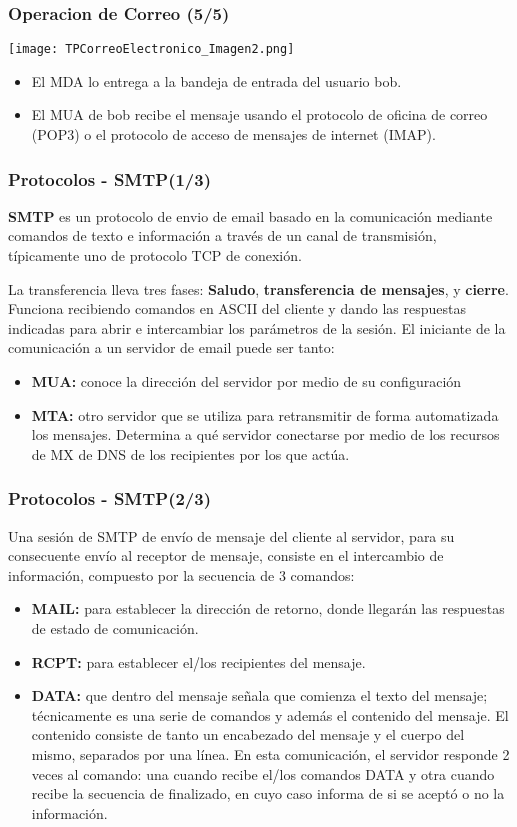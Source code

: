 \documentclass{beamer}
\begin{document}
\begin{frame}
\frametitle{Operacion de Correo (5/5)}
\tableofcontents
\centering
\texttt{[image: TPCorreoElectronico\_Imagen2.png]}
\begin{itemize}
\item \small El MDA lo entrega a la bandeja de entrada del usuario bob.
\item \small El MUA de bob recibe el mensaje usando el protocolo de oficina de correo (POP3) o el protocolo de acceso de mensajes de internet (IMAP).
\end{itemize}

\end{frame}


\begin{frame}
\frametitle{Protocolos -  SMTP(1/3)}
\tableofcontents
\textbf{SMTP} es un protocolo de envio de email basado en la comunicación mediante comandos de texto e información a través de un canal de transmisión, típicamente uno de protocolo TCP de conexión.

La transferencia lleva tres fases: \textbf{Saludo}, \textbf{transferencia de mensajes}, y\textbf{ cierre}.  Funciona recibiendo comandos en ASCII del cliente y dando las respuestas indicadas para abrir e intercambiar los parámetros de la sesión.
El iniciante de la comunicación a un servidor de email puede ser tanto:
\begin{itemize}
\item \small \textbf{MUA:} conoce la dirección del servidor por medio de su configuración
\item \small \textbf{MTA:} otro servidor que se utiliza para retransmitir de forma automatizada los mensajes.  Determina a qué servidor conectarse por medio de los recursos de MX de DNS de los recipientes por los que actúa. 
\end{itemize}

\end{frame}

\begin{frame}
\frametitle{Protocolos -  SMTP(2/3)}
\tableofcontents
Una sesión de SMTP de envío de mensaje del cliente al servidor, para su consecuente envío al receptor de mensaje, consiste en el intercambio de información, compuesto por la secuencia de 3 comandos:
\begin{itemize}
\item  \small \textbf{MAIL:} para establecer la dirección de retorno, donde llegarán las respuestas de estado de comunicación.
\item  \small \textbf{RCPT:} para establecer el/los recipientes del mensaje.
\item  \small \textbf{DATA:} que dentro del mensaje señala que comienza el texto del mensaje; técnicamente es una serie de comandos y además el contenido del mensaje. El contenido consiste de tanto un encabezado del mensaje y  el cuerpo del mismo, separados por una línea. En esta comunicación, el servidor responde 2 veces al comando: una cuando recibe el/los comandos DATA y otra cuando recibe la secuencia de finalizado, en cuyo caso informa de si se aceptó o no la información.
\end{itemize}

\end{frame}
\end{document}
